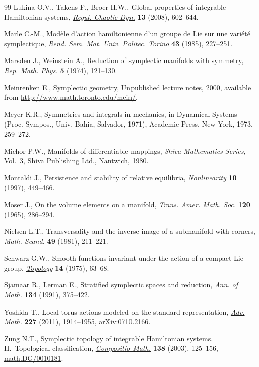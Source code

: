 \documentclass[10pt,a4paper]{amsart}
\numberwithin{equation}{section}
\begin{document}
\begin{thebibliography}{99}
Lukina O.V., Takens F., Broer H.W., Global properties of integrable
  {H}amiltonian systems, \href{http://dx.doi.org/10.1134/S1560354708060105}{\textit{Regul. Chaotic Dyn.}} \textbf{13} (2008),
  602--644.

Marle C.-M., Mod\`ele d'action hamiltonienne d'un groupe de {L}ie sur une
  vari\'et\'e symplectique, \textit{Rend. Sem. Mat. Univ. Politec. Torino}
  \textbf{43} (1985), 227--251.

Marsden J., Weinstein A., Reduction of symplectic manifolds with symmetry,
  \href{http://dx.doi.org/10.1016/0034-4877(74)90021-4}{\textit{Rep. Math. Phys.}} \textbf{5} (1974), 121--130.

Meinrenken E., Symplectic geometry, {U}npublished lecture notes, 2000,
  available from \url{http://www.math.toronto.edu/mein/}.

Meyer K.R., Symmetries and integrals in mechanics, in Dynamical Systems
  ({P}roc. {S}ympos., {U}niv. {B}ahia, {S}alvador, 1971), Academic Press, New
  York, 1973, 259--272.

Michor P.W., Manifolds of dif\/ferentiable mappings, \textit{Shiva Mathematics
  Series}, Vol.~3, Shiva Publishing Ltd., Nantwich, 1980.

Montaldi J., Persistence and stability of relative equilibria,
  \href{http://dx.doi.org/10.1088/0951-7715/10/2/009}{\textit{Nonlinearity}} \textbf{10} (1997), 449--466.

Moser J., On the volume elements on a manifold, \href{http://dx.doi.org/10.1090/S0002-9947-1965-0182927-5}{\textit{Trans. Amer. Math.
  Soc.}} \textbf{120} (1965), 286--294.

Nielsen L.T., Transversality and the inverse image of a submanifold with
  corners, \textit{Math. Scand.} \textbf{49} (1981), 211--221.

Schwarz G.W., Smooth functions invariant under the action of a compact {L}ie
  group, \href{http://dx.doi.org/10.1016/0040-9383(75)90036-1}{\textit{Topology}} \textbf{14} (1975), 63--68.

Sjamaar R., Lerman E., Stratif\/ied symplectic spaces and reduction, \href{http://dx.doi.org/10.2307/2944350}{\textit{Ann.
  of Math.}} \textbf{134} (1991), 375--422.

Yoshida T., Local torus actions modeled on the standard representation,
  \href{http://dx.doi.org/10.1016/j.aim.2011.04.007}{\textit{Adv. Math.}} \textbf{227} (2011), 1914--1955, \href{http://arxiv.org/abs/0710.2166}{arXiv:0710.2166}.

Zung N.T., Symplectic topology of integrable {H}amiltonian systems.
  {II}.~{T}opological classif\/ication, \href{http://dx.doi.org/10.1023/A:1026133814607}{\textit{Compositio Math.}} \textbf{138}
  (2003), 125--156, \href{http://arxiv.org/abs/math.DG/0010181}{math.DG/0010181}.

\end{thebibliography}
\end{document}
